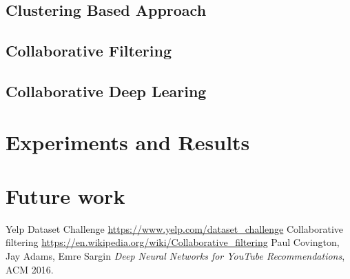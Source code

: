 \documentclass[11pt]{article}
\begin{document}
		\subsection{Clustering Based Approach}
		
		\subsection{Collaborative Filtering}
		
		\subsection{Collaborative Deep Learing}
		
		
		
	
	\section{Experiments and Results}
	
	\section{Future work}
	
	
	\begin{thebibliography}{9}
		
	 Yelp Dataset Challenge \url{https://www.yelp.com/dataset_challenge}
	Collaborative filtering \url{https://en.wikipedia.org/wiki/Collaborative_filtering}
	 Paul Covington, Jay Adams, Emre Sargin \textit{Deep Neural Networks for YouTube Recommendations}, ACM 2016.
		
	\end{thebibliography}
	
	
	
	
	
	
\end{document}
